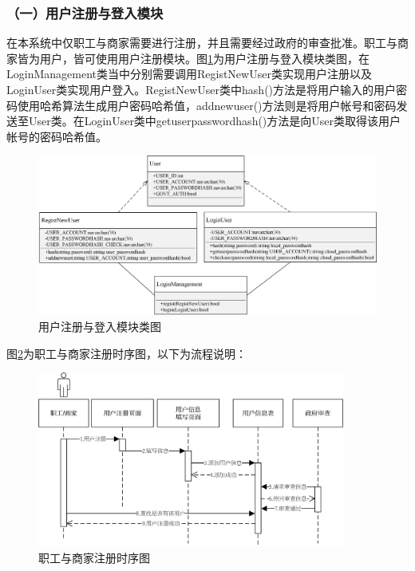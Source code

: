 \subsubsection{（一）用户注册与登入模块}
在本系统中仅职工与商家需要进行注册，并且需要经过政府的审查批准。职工与商家皆为用户，皆可使用用户注册模块。图\ref{c3}为用户注册与登入模块类图，在LoginManagement类当中分别需要调用RegistNewUser类实现用户注册以及LoginUser类实现用户登入。RegistNewUser类中hash()方法是将用户输入的用户密码使用哈希算法生成用户密码哈希值，addnewuser()方法则是将用户帐号和密码发送至User类。在LoginUser类中getuserpasswordhash()方法是向User类取得该用户帐号的密码哈希值。

	\begin{figure}[!htbp]
		\centering
		\includegraphics[width = 1\textwidth]{c3.jpg}
		\caption{用户注册与登入模块类图}\label{c3}
	\end{figure}

	图\ref{time1}为职工与商家注册时序图，以下为流程说明：

	\begin{figure}[!htbp]
		\centering
		\includegraphics[width = 0.9\textwidth]{time1.jpg}
		\caption{职工与商家注册时序图}\label{time1}
	\end{figure}

